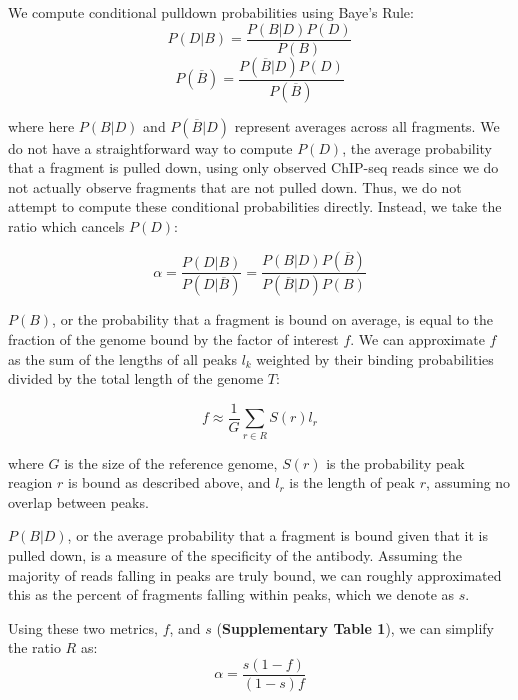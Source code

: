 \documentclass[12pt]{article}
\begin{document}
We compute conditional pulldown probabilities using Baye's Rule:
\begin{equation}
  P(D|B) = \frac{P(B|D)P(D)}{P(B)}
\end{equation}
\begin{equation}
  P(\overline{B}) = \frac{P(\overline{B}|D)P(D)}{P(\overline{B})}
\end{equation}

where here $P(B|D)$ and $P(\overline{B}|D)$ represent averages across all fragments.
We do not have a straightforward way to compute $P(D)$, the average probability that a fragment is pulled down, using only observed ChIP-seq reads since we do not actually observe fragments that are not pulled down.
Thus, we do not attempt to compute these conditional probabilities directly.
Instead, we take the ratio which cancels $P(D)$:

\begin{equation}
\alpha = \frac{P(D|B)}{P(D|\overline{B})} = \frac{P(B|D)P(\overline{B})}{P(\overline{B}|D)P(B)}
\end{equation}

$P(B)$, or the probability that a fragment is bound on average, is equal to the fraction of the genome bound by the factor of interest $f$.
We can approximate $f$ as the sum of the lengths of all peaks $l_k$ weighted by their binding probabilities divided by the total length of the genome $T$:

\begin{equation}
  f \approx \frac{1}{G} \sum_{r \in R} S(r)l_r
\end{equation}

where $G$ is the size of the reference genome, $S(r)$ is the probability peak reagion $r$ is bound as described above, and $l_r$ is the length of peak $r$, assuming no overlap between peaks. %

$P(B|D)$, or the average probability that a fragment is bound given that it is pulled down, is a measure of the specificity of the antibody. Assuming the majority of reads falling in peaks are truly bound, we can roughly approximated this as the percent of fragments falling within peaks, which we denote as $s$.

Using these two metrics, $f$, and $s$ (\textbf{Supplementary Table 1}), we can simplify the ratio $R$ as:
\begin{equation} \label{eq:ratiosimple}
  \alpha = \frac{s(1-f)}{(1-s)f}
\end{equation}
\end{document}

